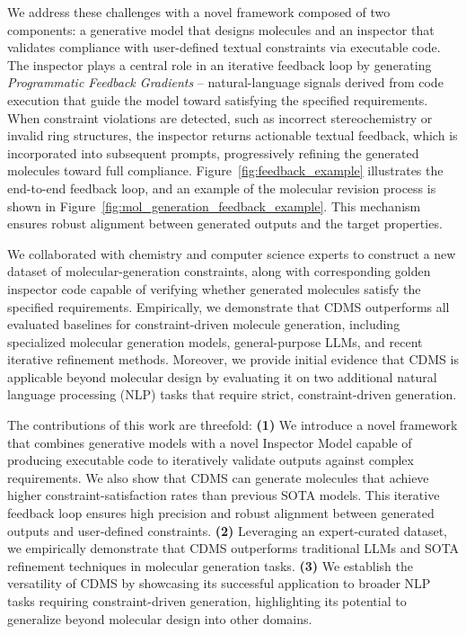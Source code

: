 \documentclass[10pt]{article} %
\begin{document}
   We address these challenges with a novel framework composed of two components: a generative model that designs molecules and an inspector that validates compliance with user-defined textual constraints via executable code. The inspector plays a central role in an iterative feedback loop by generating \emph{Programmatic Feedback Gradients} -- natural-language signals derived from code execution that guide the model toward satisfying the specified requirements. When constraint violations are detected, such as incorrect stereochemistry or invalid ring structures, the inspector returns actionable textual feedback, which is incorporated into subsequent prompts, progressively refining the generated molecules toward full compliance. Figure~\ref{fig:feedback_example} illustrates the end-to-end feedback loop, and an example of the molecular revision process is shown in Figure~\ref{fig:mol_generation_feedback_example}. This mechanism ensures robust alignment between generated outputs and the target properties.
    
    We collaborated with chemistry and computer science experts to construct a new dataset of molecular-generation constraints, along with corresponding golden inspector code capable of verifying whether generated molecules satisfy the specified requirements. Empirically, we demonstrate that CDMS outperforms all evaluated baselines for constraint-driven molecule generation, including specialized molecular generation models, general-purpose LLMs, and recent iterative refinement methods. Moreover, we provide initial evidence that CDMS is applicable beyond molecular design by evaluating it on two additional natural language processing (NLP) tasks that require strict, constraint-driven generation.
    
The contributions of this work are threefold:
    \textbf{(1)} We introduce a novel framework that combines generative models with a novel Inspector Model capable of producing executable code to iteratively validate outputs against complex requirements. We also show that CDMS can generate molecules that achieve higher constraint-satisfaction rates than previous SOTA models. This iterative feedback loop ensures high precision and robust alignment between generated outputs and user-defined constraints. \textbf{(2)} Leveraging an expert-curated dataset, we empirically demonstrate that CDMS outperforms traditional LLMs and SOTA refinement techniques in molecular generation tasks. \textbf{(3)} We establish the versatility of CDMS by showcasing its successful application to broader NLP tasks requiring constraint-driven generation, highlighting its potential to generalize beyond molecular design into other domains.
    
\end{document}
